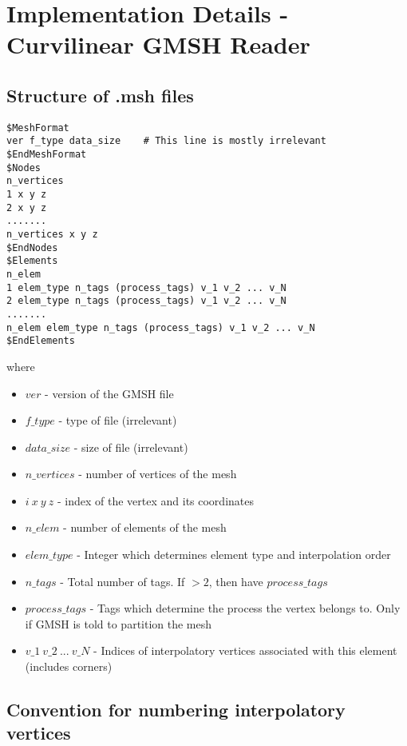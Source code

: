 
\section{Implementation Details - Curvilinear GMSH Reader}

\subsection{Structure of .msh files}

\begin{mybox}
\begin{lstlisting}
$MeshFormat
ver f_type data_size    # This line is mostly irrelevant
$EndMeshFormat
$Nodes
n_vertices
1 x y z
2 x y z
.......
n_vertices x y z
$EndNodes
$Elements
n_elem
1 elem_type n_tags (process_tags) v_1 v_2 ... v_N
2 elem_type n_tags (process_tags) v_1 v_2 ... v_N
.......
n_elem elem_type n_tags (process_tags) v_1 v_2 ... v_N
$EndElements
\end{lstlisting}
\end{mybox}

\noindent
where
\begin{itemize}
	\item $ver$             - version of the GMSH file
	\item $f\_type$          - type of file (irrelevant)
	\item $data\_size$       - size of file (irrelevant)
	\item $n\_vertices$      - number of vertices of the mesh
	\item $i\ x\ y\ z$         - index of the vertex and its coordinates
	\item $n\_elem$          - number of elements of the mesh
	\item $elem\_type$       - Integer which determines element type and interpolation order
	\item $n\_tags$          - Total number of tags. If $>2$, then have $process\_tags$
	\item $process\_tags$    - Tags which determine the process the vertex belongs to. Only if GMSH is told to partition the mesh
	\item $v\_1\ v\_2\ ...\ v\_N$ - Indices of interpolatory vertices associated with this element (includes corners)
\end{itemize}

\subsection{Convention for numbering interpolatory vertices}

